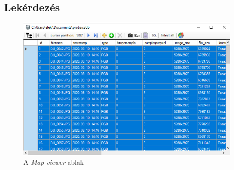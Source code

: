 \documentclass[a4paper,12pt]{article}
\begin{document}
\subsection{Lekérdezés}

	\begin{figure}
	\centering
	\includegraphics[width=12cm]{mapviewer_select_all.png}
	\caption{A \textit{Map viewer} ablak}
	\label{fig:mapviewer_select_all}
\end{figure}
\end{document}
